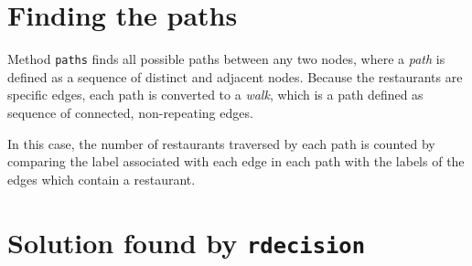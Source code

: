 \documentclass[
]{article}
\newenvironment{Shaded}{\begin{snugshade}}{\end{snugshade}}
\newcommand{\CommentTok}[1]{\textcolor[rgb]{0.56,0.35,0.01}{\textit{#1}}}
\newcommand{\ControlFlowTok}[1]{\textcolor[rgb]{0.13,0.29,0.53}{\textbf{#1}}}
\newcommand{\DecValTok}[1]{\textcolor[rgb]{0.00,0.00,0.81}{#1}}
\newcommand{\KeywordTok}[1]{\textcolor[rgb]{0.13,0.29,0.53}{\textbf{#1}}}
\newcommand{\NormalTok}[1]{#1}
\newcommand{\OperatorTok}[1]{\textcolor[rgb]{0.81,0.36,0.00}{\textbf{#1}}}
\newcommand{\StringTok}[1]{\textcolor[rgb]{0.31,0.60,0.02}{#1}}
\begin{document}
\hypertarget{finding-the-paths}{%
\section{Finding the paths}\label{finding-the-paths}}

Method \texttt{paths} finds all possible paths between any two nodes,
where a \emph{path} is defined as a sequence of distinct and adjacent
nodes. Because the restaurants are specific edges, each path is
converted to a \emph{walk}, which is a path defined as sequence of
connected, non-repeating edges.

In this case, the number of restaurants traversed by each path is
counted by comparing the label associated with each edge in each path
with the labels of the edges which contain a restaurant.

\begin{Shaded}
\end{Shaded}

\hypertarget{solution-found-by-rdecision}{%
\section{\texorpdfstring{Solution found by
\texttt{rdecision}}{Solution found by rdecision}}\label{solution-found-by-rdecision}}
\end{document}

